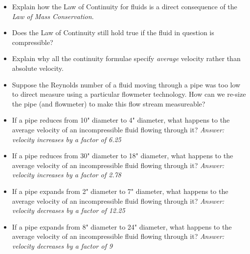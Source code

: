 \begin{itemize}
\item{} Explain how the Law of Continuity for fluids is a direct consequence of the {\it Law of Mass Conservation}.
\item{} Does the Law of Continuity still hold true if the fluid in question is compressible?
\item{} Explain why all the continuity formulae specify {\it average} velocity rather than absolute velocity. 
\item{} Suppose the Reynolds number of a fluid moving through a pipe was too low to direct measure using a particular flowmeter technology.  How can we re-size the pipe (and flowmeter) to make this flow stream measureable?
\item{} If a pipe reduces from 10" diameter to 4" diameter, what happens to the average velocity of an incompressible fluid flowing through it?  {\it Answer: velocity increases by a factor of 6.25}
\item{} If a pipe reduces from 30" diameter to 18" diameter, what happens to the average velocity of an incompressible fluid flowing through it?  {\it Answer: velocity increases by a factor of 2.78}
\item{} If a pipe expands from 2" diameter to 7" diameter, what happens to the average velocity of an incompressible fluid flowing through it?  {\it Answer: velocity decreases by a factor of 12.25}
\item{} If a pipe expands from 8" diameter to 24" diameter, what happens to the average velocity of an incompressible fluid flowing through it?  {\it Answer: velocity decreases by a factor of 9}
\end{itemize}




